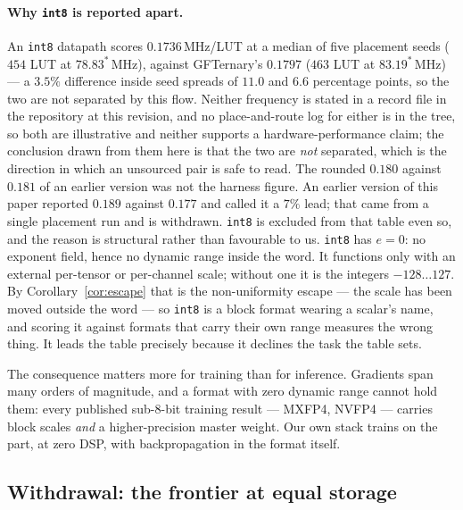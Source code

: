 \paragraph{Why \texttt{int8} is reported apart.}
An \texttt{int8} datapath scores $0.1736$\,MHz/LUT at a median of five placement
seeds ($454$ LUT at $78.83^{\ast}$\,MHz), against GFTernary's $0.1797$ ($463$ LUT at
$83.19^{\ast}$\,MHz) --- a $3.5\%$ difference inside seed spreads of $11.0$ and $6.6$
percentage points, so the two are not separated by this flow. Neither frequency is
stated in a record file in the repository at this revision, and no place-and-route
log for either is in the tree, so both are illustrative and neither supports a
hardware-performance claim; the conclusion drawn from them here is that the two are
\emph{not} separated, which is the direction in which an unsourced pair is safe to
read. The rounded
$0.180$ against $0.181$ of an earlier version was not the harness figure. An earlier version of
this paper reported $0.189$ against $0.177$ and called it a $7\%$ lead; that came
from a single placement run and is withdrawn. \texttt{int8} is excluded from that table even so, and the
reason is structural rather than favourable to us. \texttt{int8} has $e=0$: no exponent field, hence no dynamic
range inside the word. It functions only with an external per-tensor or
per-channel scale; without one it is the integers $-128\ldots127$. By
Corollary~\ref{cor:escape} that is the non-uniformity escape --- the scale has
been moved outside the word --- so \texttt{int8} is a block format wearing a
scalar's name, and scoring it against formats that carry their own range measures
the wrong thing. It leads the table precisely because it declines the task the
table sets.

The consequence matters more for training than for inference. Gradients span many
orders of magnitude, and a format with zero dynamic range cannot hold them: every
published sub-8-bit training result --- MXFP4, NVFP4 --- carries block scales
\emph{and} a higher-precision master weight. Our own stack trains on the part, at
zero DSP, with backpropagation in the format itself.



\subsection{Withdrawal: the frontier at equal storage}
\label{sec:packedfrontier}

